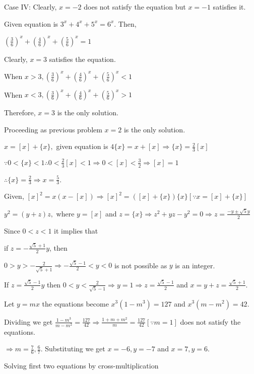   Case IV: Clearly, $x = -2$ does not satisfy the equation but $x = -1$ satisfies it.
\item Given equation is $3^x + 4^x + 5^x = 6^x$. Then,

  $\left(\frac{3}{6}\right)^x + \left(\frac{4}{6}\right)^x + \left(\frac{5}{6}\right)^x = 1$

  Clearly, $x = 3$ satisfies the equation.

  When $x > 3, \left(\frac{3}{6}\right)^x + \left(\frac{4}{6}\right)^x + \left(\frac{5}{6}\right)^x < 1$

  When $x < 3, \left(\frac{3}{6}\right)^x + \left(\frac{4}{6}\right)^x + \left(\frac{5}{6}\right)^x > 1$

  Therefore, $x = 3$ is the only solution.
\item Proceeding as previous problem $x = 2$ is the only solution.
\item $x = [x] + \{x\},$ given equation is $4\{x\} = x + [x] \Rightarrow \{x\} = \frac{2}{3}[x]$

  $\because 0 < \{x\} < 1 \therefore 0 < \frac{2}{3}[x] < 1 \Rightarrow 0 < [x] < \frac{3}{2} \Rightarrow
  [x] = 1$

  $\therefore \{x\} = \frac{2}{3} \Rightarrow x = \frac{5}{3}$.
\item Given, $[x]^2 = x(x - [x])\Rightarrow [x]^2 = ([x] + \{x\})\{x\} [\because x = [x] + \{x\}]$

  $y^2 = (y + z)z,$ where $y = [x]$ and $z = \{x\}\Rightarrow z^2 + yz - y^2 = 0 \Rightarrow z = \frac{-y
  \pm \sqrt{5}y}{2}$

  Since $0 < z < 1$ it implies that

  if $z = -\frac{\sqrt{5} + 1}{2}y$, then

  $0 > y > -\frac{2}{\sqrt{5} + 1}\Rightarrow -\frac{\sqrt{5} - 1}{2} < y < 0$ is not possible as $y$ is an
  integer.

  If $z = \frac{\sqrt{5} - 1}{2}y$ then $0 < y < \frac{2}{\sqrt{5} - 1} \Rightarrow y = 1\Rightarrow z =
  \frac{\sqrt{5} - 1}{2}$ and $x = y + z = \frac{\sqrt{5} + 1}{2}$.
\item Let $y = mx$ the equations become $x^3(1 - m^3) = 127$ and $x^3(m - m^2) = 42$.

  Dividing we get $\frac{1 - m^3}{m - m^2} = \frac{127}{42}\Rightarrow \frac{1 + m + m^2}{m} =
  \frac{127}{42} [\because m = 1]$ does not satisfy the equations.

  $\Rightarrow m = \frac{7}{6}, \frac{6}{7}$. Substituting we get $x = -6, y = -7$ and $x = 7, y = 6$.
\item Solving first two equations by cross-multiplication

